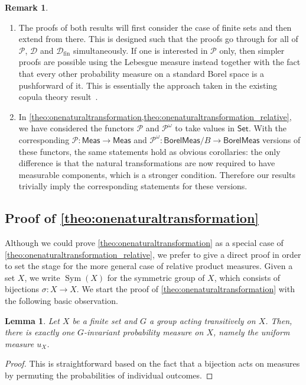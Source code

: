 \documentclass[11pt,a4paper]{scrartcl}
\newcommand{\setc}{\mathsf{Set}}
\newcommand{\meas}{\mathsf{Meas}}
\newcommand{\borelmeas}{\mathsf{BorelMeas}}
\newcommand{\dist}{\mathcal{D}}
\newcommand{\distfin}{\mathcal{D}_{\mathrm{fin}}}
\newcommand{\giry}{\mathcal{P}}
\newcommand{\Sym}{\operatorname{Sym}}
\newtheorem{lem}[theo]{Lemma}
\theoremstyle{definition}
\newtheorem{rem}[theo]{Remark}
\begin{document}
\begin{rem}
	\begin{enumerate}
		\item 
			The proofs of both results will first consider the case of finite sets and then extend from there.
			This is designed such that the proofs go through for all of $\giry$, $\dist$ and $\distfin$ simultaneously.
			If one is interested in $\giry$ only,
			then simpler proofs are possible using the Lebesgue measure instead together with the fact that every other probability measure on a standard Borel space is a pushforward of it.
			This is essentially the approach taken in the existing copula theory result~\cite[Theorem~3.1]{Durante2009}.
		\item 
			In \cref{theo:onenaturaltransformation,theo:onenaturaltransformation_relative}, we have considered the functors $\giry$ and $\giry^\omega$ to take values in $\setc$.
			With the corresponding $\giry : \meas \to \meas$ and $\giry^\omega : \borelmeas/B \to \borelmeas$ versions of these functors,
			the same statements hold as obvious corollaries: 
			the only difference is that the natural transformations are now required to have measurable components, which is a stronger condition.
			Therefore our results trivially imply the corresponding statements for these versions.
	\end{enumerate}
\end{rem}

\subsection{Proof of \cref{theo:onenaturaltransformation}}

Although we could prove \cref{theo:onenaturaltransformation} as a special case of \cref{theo:onenaturaltransformation_relative},
we prefer to give a direct proof in order to set the stage for the more general case of relative product measures.
Given a set $X$, we write $\Sym(X)$ for the symmetric group of $X$, which consists of bijections $\sigma: X \rightarrow X$.
We start the proof of \cref{theo:onenaturaltransformation} with the following basic observation.

\begin{lem}\label{lem:uniquepermutationinvariantmeasure}
  Let $X$ be a finite set and $G$ a group acting transitively on $X$. Then, there is exactly one $G$-invariant probability measure on $X$, namely the uniform measure $u_X$.
\end{lem}
\begin{proof}
  This is straightforward based on the fact that a bijection acts on measures by permuting the probabilities of individual outcomes.
\end{proof}
\end{document}
